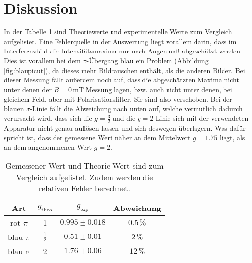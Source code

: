 \section{Diskussion}
\label{sec:Diskussion}
In der Tabelle \ref{tab:vergleich} sind Theoriewerte und experimentelle
Werte zum Vergleich aufgelistet.
Eine Fehlerquelle in der Auswertung liegt vorallem darin, dass
im Interferenzbild die Intensitätsmaxima nur nach Augenmaß abgeschätzt werden.
Dies ist vorallem bei dem $\pi$-Übergang blau ein Problem (Abbildung \ref{fig:blaupicut}),
da dieses mehr Bildrauschen enthält, als die anderen Bilder.
Bei dieser Messung fällt außerdem noch auf, dass die abgeschätzten Maxima
nicht unter denen der $B=0\,\si{\milli\tesla}$ Messung lagen, bzw.
auch nicht unter denen, bei gleichem Feld, aber mit Polarisationsfilter.
Sie sind also verschoben.
Bei der blauen $\sigma$-Linie fällt die Abweichung nach unten auf, welche
vermutlich dadurch verursacht wird, dass sich die $g=\frac{3}{2}$ und die
$g=2$ Linie sich mit der verwendeten Apparatur nicht genau auflösen lassen und sich
deswegen überlagern. Was dafür spricht ist, dass der gemessene Wert
näher an dem Mittelwert $g=1.75$ liegt, als an dem angenommenen Wert $g=2$.

\begin{table}
  \centering
  \caption{Gemessener Wert und Theorie Wert sind zum Vergleich aufgelistet.
  Zudem werden die relativen Fehler berechnet.}
  \label{tab:vergleich}
  \begin{tabular}{c | c | c | c}
    \toprule
    Art & $g_\text{theo}$ & $g_\text{exp}$ & Abweichung\\
    \midrule
    rot $\pi$     & 1 & $0.995\pm0.018$ & $0.5 \, \si{\percent}$ \\
    blau $\pi$    & $\frac{1}{2}$ &$0.51 \pm 0.01$ & $2 \, \si{\percent}$ \\
    blau $\sigma$ & 2 & $1.76 \pm 0.06$ & $12 \, \si{\percent}$ \\
    \bottomrule
  \end{tabular}
\end{table}

